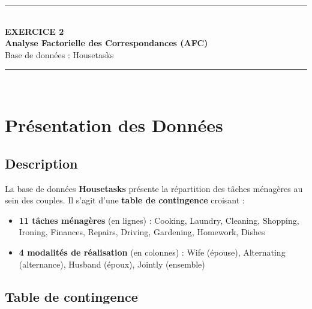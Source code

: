 \documentclass[12pt,a4paper]{article}
\begin{document}
\begin{center}
    \rule{\linewidth}{0.5mm}\\[0.4cm]
    {\Huge \textbf{EXERCICE 2}}\\[0.3cm]
    {\Large \textbf{Analyse Factorielle des Correspondances (AFC)}}\\[0.2cm]
    {\large Base de données : Housetasks}\\[0.1cm]
    \rule{\linewidth}{0.5mm}\\[1cm]
\end{center}

\section{Présentation des Données}

\subsection{Description}

La base de données \textbf{Housetasks} présente la répartition des tâches ménagères au sein des couples. Il s'agit d'une \textbf{table de contingence} croisant :
\begin{itemize}
    \item \textbf{11 tâches ménagères} (en lignes) : Cooking, Laundry, Cleaning, Shopping, Ironing, Finances, Repairs, Driving, Gardening, Homework, Dishes
    \item \textbf{4 modalités de réalisation} (en colonnes) : Wife (épouse), Alternating (alternance), Husband (époux), Jointly (ensemble)
\end{itemize}

\subsection{Table de contingence}
\end{document}
